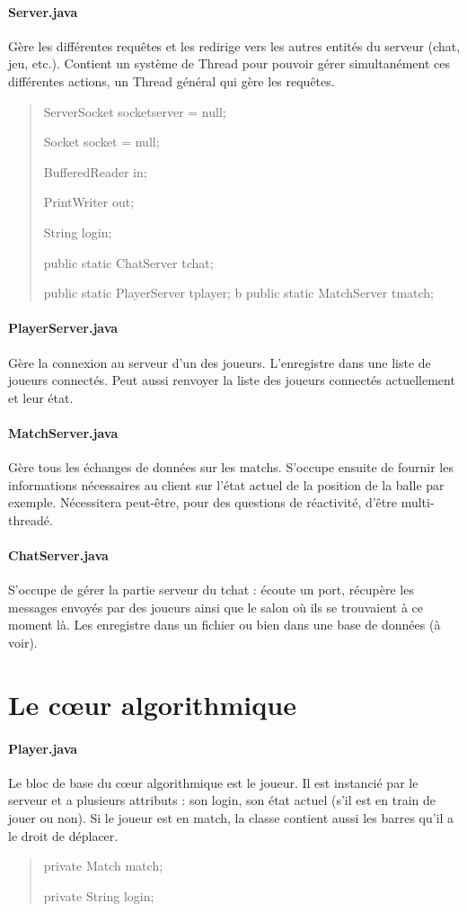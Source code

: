 \documentclass[a4paper,12pt]{report}
\begin{document}
\paragraph{Server.java}
Gère les différentes requêtes et les redirige vers les autres entités du serveur (chat, jeu, etc.). Contient un système de Thread pour pouvoir gérer simultanément ces différentes actions, un Thread général qui gère les requêtes.
\begin{quote}
    ServerSocket socketserver = null;
    
	Socket socket = null;
    
	BufferedReader in;
    
	PrintWriter out;
    
	String login;
    
	public static ChatServer tchat;
    
	public static PlayerServer tplayer;
    b
	public static MatchServer tmatch;
\end{quote}
\paragraph{PlayerServer.java}
Gère la connexion au serveur d'un des joueurs. L'enregistre dans une liste de joueurs connectés. Peut aussi renvoyer la liste des joueurs connectés actuellement et leur état.
\paragraph{MatchServer.java}
Gère tous les échanges de données sur les matchs. S'occupe ensuite de fournir les informations nécessaires au client sur l'état actuel de la position de la balle par exemple. Nécessitera peut-être, pour des questions de réactivité, d'être multi-threadé.
\paragraph{ChatServer.java}
S'occupe de gérer la partie serveur du tchat : écoute un port, récupère les messages envoyés par des joueurs ainsi que le salon où ils se trouvaient à ce moment là. Les enregistre dans un fichier ou bien dans une base de données (à voir).


\section{Le c\oe{}ur algorithmique}
\paragraph{Player.java}
Le bloc de base du c\oe{}ur algorithmique est le joueur. Il est instancié par le serveur et a plusieurs attributs : son login, son état actuel (s'il est en train de jouer ou non). Si le joueur est en match, la classe contient aussi les barres qu'il a le droit de déplacer.
\begin{quote}
	private Match match;
    
	private String login;
\end{quote}
\end{document}
